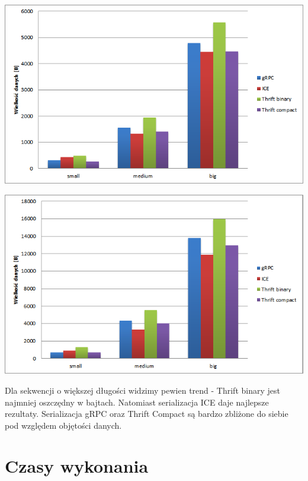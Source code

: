 \documentclass[12pt]{article}
\begin{document}
\begin{center}
\centering
    \includegraphics{bytes_100.png}
\end{center}
\begin{center}
\centering
    \includegraphics{bytes_300.png}
\end{center}

Dla sekwencji o większej długości widzimy pewien trend - Thrift binary jest najmniej oszczędny w bajtach. Natomiast serializacja ICE daje najlepsze rezultaty. Serializacja gRPC oraz Thrift Compact są bardzo zbliżone do siebie pod względem objętości danych.



\section{Czasy wykonania}
\end{document}
